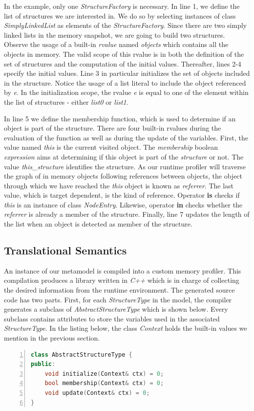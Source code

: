 In the example, only one \textit{StructureFactory} is necessary.
In line 1, we define the list of structures we are interested in.
We do so by selecting instances of class \textit{SimplyLinkedList} as elements of the \textit{StructureFactory}.
Since there are two simply linked lists in the memory snapshot, we are going to build two structures.
Observe the usage of a built-in \textit{rvalue} named \textit{objects} which contains all the objects in memory.
The valid scope of this rvalue is in both the definition of the set of structures and the computation of the initial values.
Thereafter, lines 2-4 specify the initial values.
Line 3 in particular initializes the set of objects included in the structure.
Notice the usage of a list literal to include the object referenced by \textit{e}.
In the initialization scope, the rvalue \textit{e} is equal to one of the element within the list of structures - either \textit{list0} or \textit{list1}.

In line 5 we define the membership function, which is used to determine if an object is part of the structure.
There are four built-in rvalues during the evaluation of the function as well as during the update of the variables.
First, the value named \textit{this} is the current visited object. 
The \textit{membership} boolean \textit{expression} aims at determining if this object is part of the \textit{structure} or not. 
The value \textit{this\_structure} identifies the structure.
As our runtime profiler will traverse the graph of in memory objects following references between objects, the object through which we have reached the \textit{this} object is known as \textit{referrer}.
The last value, which is target dependent, is the kind of reference.
Operator \textbf{is} checks if \textit{this} is an instance of class \textit{NodeEntry}.
Likewise, operator \textbf{in} checks whether the \textit{referrer} is already a member of the structure.
Finally, line 7 updates the length of the list when an object is detected as member of the structure.

\subsection{Translational Semantics}\label{sec:semantic}

An instance of our metamodel is compiled into a custom memory profiler.
This compilation produces a library written in \textit{C++} which is in charge of collecting the desired information from the runtime environment.
The generated source code has two parts.
First, for each \textit{StructureType} in the model, the compiler generates a subclass of \textit{AbstractStructureType} which is shown below.
Every subclass contains attributes to store the variables used in the associated \textit{StructureType}.
In the listing below, the class \textit{Context} holds the built-in values we mention in the previous section.
\begin{lstlisting}[language=C++, frame=tblr,
numbers=left,
numberstyle=\color{black}\scriptsize,]
class AbstractStructureType {
public:
	void initialize(Context& ctx) = 0;
	bool membership(Context& ctx) = 0;
	void update(Context& ctx) = 0;
}
\end{lstlisting}

